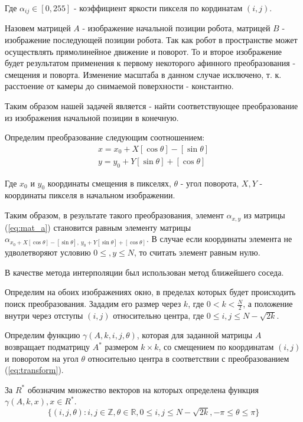 \documentclass[a4paper,12pt]{article}
\begin{document}
Где $\alpha_{ij} \in [0,255]$ - коэффициент яркости пикселя по кординатам $(i,j)$. 

Назовем матрицей $A$ - изображение начальной позиции робота, матрицей $B$ - изображение последующей позиции робота. Так как робот в пространстве может осуществлять прямолинейное движение и поворот. То и второе изображение будет результатом применения к первому некоторого афинного преобразования - смещения и поворта. Изменение масштаба в данном случае исключено, т. к. расстоение от камеры до снимаемой поверхности - константно. 

Таким образом нашей задачей является - найти соответствующее преобразование из изображения начальной позиции в конечную.

Определим преобразование следующим соотношением:
\begin{equation}
    \begin{array}{c}
        x = x_0 + X [\cos \theta] - [\sin \theta] \\
        y = y_0 + Y [\sin \theta] + [\cos \theta]
    \end{array}
    \label{eq:transform}
\end{equation}

Где $x_0$ и $y_0$ координаты смещения в пикселях, $\theta$ - угол поворота, $X,Y$ - координаты пикселя в начальном изображении.

Таким образом, в результате такого преобразования, элемент $\alpha_{x,y}$ из матрицы (\ref{eq:mat_a}) становится равным элементу матрицы $\alpha_{x_0+X[\cos \theta]-[\sin \theta],~y_0+Y[\sin \theta]+[\cos \theta]}$. В случае если координаты элемента не удволетворяют условию $0\leq,y\leq N$, то считать элемент равным нулю.

В качестве метода интерполяции был использован метод ближейшего соседа.

Определим на обоих изображениях окно, в пределах которых будет происходить поиск преобразования.
Зададим его размер через $k$, где $0 < k < \frac{N}{2}$, а положение внутри через отступы $(i,j)$ относительно центра, где $0 \leq i,j \leq N-\sqrt{2k}$.

Определим функцию $\gamma(A, k, i, j, \theta)$, которая для заданной матрицы $A$ возвращает подматрицу $A^*$ размером $k \times k$, со смещением по координатам $(i,j)$ и поворотом на угол $\theta$ относительно центра в соответствии с преобразованием (\ref{eq:transform}).

За $R^*$ обозначим множество векторов на которых определена функция $\gamma(A,k,x),x\in R^*$.
\begin{equation}
    \{(i,j,\theta):i,j\in \mathbb{Z}, \theta \in \mathbb{R}, 0 \leq i,j \leq N-\sqrt{2k}, -\pi \leq \theta \leq \pi\}
\end{equation}
\end{document}
